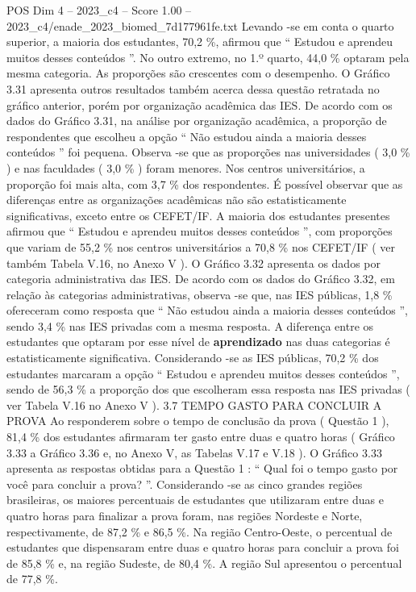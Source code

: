 \begin{textsample}{POS Dim 4 – 2023\_c4 – Score 1.00 – 2023\_c4/enade\_2023\_biomed\_7d177961fe.txt}
Levando -se em conta o quarto superior, a maioria dos estudantes, 70,2 \%, afirmou que “ Estudou e aprendeu muitos desses conteúdos ”.
No outro extremo, no 1.º quarto, 44,0 \% optaram pela mesma categoria.
As proporções são crescentes com o desempenho.
O Gráfico 3.31 apresenta outros resultados também acerca dessa questão retratada no gráfico anterior, porém por organização acadêmica das IES.
De acordo com os dados do Gráfico 3.31, na análise por organização acadêmica, a proporção de respondentes que escolheu a opção “ Não estudou ainda a maioria desses conteúdos ” foi pequena.
Observa -se que as proporções nas universidades ( 3,0 \% ) e nas faculdades ( 3,0 \% ) foram menores.
Nos centros universitários, a proporção foi mais alta, com 3,7 \% dos respondentes.
É possível observar que as diferenças entre as organizações acadêmicas não são estatisticamente significativas, exceto entre os CEFET/IF.
A maioria dos estudantes presentes afirmou que “ Estudou e aprendeu muitos desses conteúdos ”, com proporções que variam de 55,2 \% nos centros universitários a 70,8 \% nos CEFET/IF ( ver também Tabela V.16, no Anexo V ).
O Gráfico 3.32 apresenta os dados por categoria administrativa das IES.
De acordo com os dados do Gráfico 3.32, em relação às categorias administrativas, observa -se que, nas IES públicas, 1,8 \% ofereceram como resposta que “ Não estudou ainda a maioria desses conteúdos ”, sendo 3,4 \% nas IES privadas com a mesma resposta.
A diferença entre os estudantes que optaram por esse nível de \textbf{aprendizado} nas duas categorias é estatisticamente significativa.
Considerando -se as IES públicas, 70,2 \% dos estudantes marcaram a opção “ Estudou e aprendeu muitos desses conteúdos ”, sendo de 56,3 \% a proporção dos que escolheram essa resposta nas IES privadas ( ver Tabela V.16 no Anexo V ). 3.7 TEMPO GASTO PARA CONCLUIR A PROVA Ao responderem sobre o tempo de conclusão da prova ( Questão 1 ), 81,4 \% dos estudantes afirmaram ter gasto entre duas e quatro horas ( Gráfico 3.33 a Gráfico 3.36 e, no Anexo V, as Tabelas V.17 e V.18 ).
O Gráfico 3.33 apresenta as respostas obtidas para a Questão 1 : “ Qual foi o tempo gasto por você para concluir a prova? ”.
Considerando -se as cinco grandes regiões brasileiras, os maiores percentuais de estudantes que utilizaram entre duas e quatro horas para finalizar a prova foram, nas regiões Nordeste e Norte, respectivamente, de 87,2 \% e 86,5 \%.
Na região Centro-Oeste, o percentual de estudantes que dispensaram entre duas e quatro horas para concluir a prova foi de 85,8 \% e, na região Sudeste, de 80,4 \%.
A região Sul apresentou o percentual de 77,8 \%.

\end{textsample}
